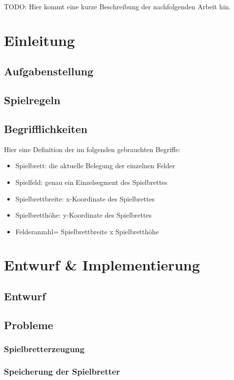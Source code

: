 \documentclass[
	12pt,
	a4paper,
	BCOR10mm,
	DIV14,
	listof=totoc,
	bibliography=totoc,
	headsepline
]{scrreprt}
\begin{document}
TODO: Hier kommt eine kurze Beschreibung der nachfolgenden Arbeit hin.

\tableofcontents

\chapter{Einleitung}
\label{Einleitung}

\section{Aufgabenstellung}

\section{Spielregeln}

\section{Begrifflichkeiten}
Hier eine Definition der im folgenden gebrauchten Begriffe:
\begin{itemize}
	\item Spielbrett: die aktuelle Belegung der einzelnen Felder
	\item Spielfeld: genau ein Einzelsegment des Spielbrettes
	\item Spielbrettbreite: x-Koordinate des Spielbrettes
	\item Spielbretthöhe: y-Koordinate des Spielbrettes
	\item Felderanzahl= Spielbrettbreite x Spielbretthöhe
\end{itemize}


\chapter{Entwurf \& Implementierung}
\label{Entwurf}

\section{Entwurf}
\section{Probleme}
\subsection{Spielbretterzeugung}
\subsection{Speicherung der Spielbretter}
\end{document}
